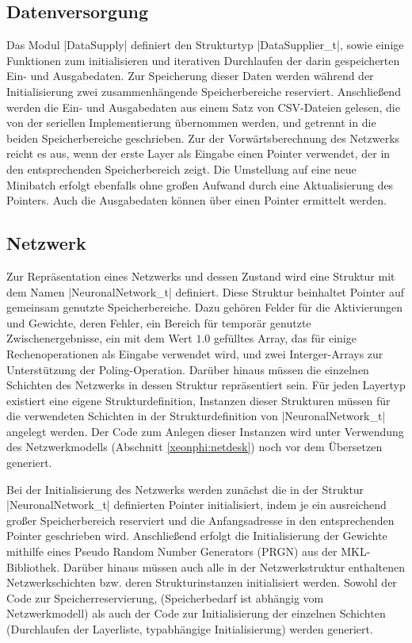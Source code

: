 \documentclass[../main.tex]{subfiles}
\begin{document}
\subsection{Datenversorgung}
Das Modul |DataSupply| definiert den Strukturtyp |DataSupplier_t|, sowie einige Funktionen zum initialisieren und iterativen Durchlaufen der darin gespeicherten Ein- und Ausgabedaten. Zur Speicherung dieser Daten werden während der Initialisierung zwei zusammenhängende Speicherbereiche reserviert. Anschließend werden die Ein- und Ausgabedaten aus einem Satz von CSV-Dateien gelesen, die von der seriellen Implementierung übernommen werden, und getrennt in die beiden Speicherbereiche geschrieben. Zur der Vorwärtsberechnung des Netzwerks reicht es aus, wenn der erste Layer als Eingabe einen Pointer verwendet, der in den entsprechenden Speicherbereich zeigt. Die Umstellung auf eine neue Minibatch erfolgt ebenfalls ohne großen Aufwand durch eine Aktualisierung des Pointers. Auch die Ausgabedaten können über einen Pointer ermittelt werden. 

\subsection{Netzwerk}
Zur Repräsentation eines Netzwerks und dessen Zustand wird eine Struktur mit dem Namen |NeuronalNetwork_t| definiert. Diese Struktur beinhaltet Pointer auf gemeinsam genutzte Speicherbereiche. Dazu gehören Felder für die Aktivierungen und Gewichte, deren Fehler, ein Bereich für temporär genutzte Zwischenergebnisse, ein mit dem Wert \(1.0\) gefülltes Array, das für einige Rechenoperationen als Eingabe verwendet wird, und zwei Interger-Arrays zur Unterstützung der Poling-Operation. Darüber hinaus müssen die einzelnen Schichten des Netzwerks in dessen Struktur repräsentiert sein. Für jeden Layertyp existiert eine eigene Strukturdefinition, Instanzen dieser Strukturen müssen für die verwendeten Schichten in der Strukturdefinition von |NeuronalNetwork_t| angelegt werden. Der Code zum Anlegen dieser Instanzen wird unter Verwendung des Netzwerkmodells (Abschnitt \ref{xeonphi:netdesk}) noch vor dem Übersetzen generiert. 

Bei der Initialisierung des Netzwerks werden zunächst die in der Struktur |NeuronalNetwork_t| definierten Pointer initialisiert, indem je ein ausreichend großer Speicherbereich reserviert und die Anfangsadresse in den entsprechenden Pointer geschrieben wird. Anschließend erfolgt die Initialisierung der Gewichte mithilfe eines Pseudo Random Number Generators (PRGN) aus der MKL-Bibliothek. Darüber hinaus müssen auch alle in der Netzwerkstruktur enthaltenen Netzwerkschichten bzw. deren Strukturinstanzen initialisiert werden. Sowohl der Code zur Speicherreservierung, (Speicherbedarf ist abhängig vom Netzwerkmodell) als auch der Code zur Initialisierung der einzelnen Schichten (Durchlaufen der Layerliste, typabhängige Initialisierung) werden generiert. 
\end{document}
